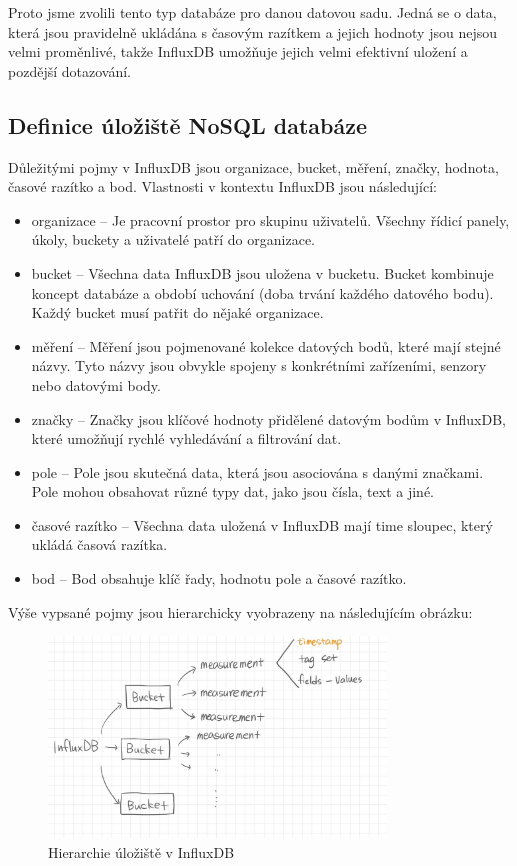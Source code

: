 \documentclass[a4paper, 11pt]{article}
\begin{document}
    Proto jsme zvolili tento typ databáze pro danou datovou sadu. Jedná se o data, která jsou pravidelně ukládána s časovým razítkem a jejich hodnoty jsou nejsou velmi proměnlivé, takže InfluxDB umožňuje jejich velmi efektivní uložení a pozdější dotazování.

    \subsection{Definice úložiště NoSQL databáze}

    Důležitými pojmy v InfluxDB jsou organizace, bucket, měření, značky, hodnota, časové razítko a bod. Vlastnosti v kontextu InfluxDB jsou následující:
    \begin{itemize}
        \item organizace -- Je pracovní prostor pro skupinu uživatelů. Všechny řídicí panely, úkoly, buckety a uživatelé patří do organizace.
        \item bucket -- Všechna data InfluxDB jsou uložena v bucketu. Bucket kombinuje koncept databáze a období uchování (doba trvání každého datového bodu). Každý bucket musí patřit do nějaké organizace.
        \item měření -- Měření jsou pojmenované kolekce datových bodů, které mají stejné názvy. Tyto názvy jsou obvykle spojeny s konkrétními zařízeními, senzory nebo datovými body.
        \item značky -- Značky jsou klíčové hodnoty přidělené datovým bodům v InfluxDB, které umožňují rychlé vyhledávání a filtrování dat.
        \item pole -- Pole jsou skutečná data, která jsou asociována s danými značkami. Pole mohou obsahovat různé typy dat, jako jsou čísla, text a jiné.
        \item časové razítko -- Všechna data uložená v InfluxDB mají \textunderscore time sloupec, který ukládá časová razítka.
        \item bod -- Bod obsahuje klíč řady, hodnotu pole a časové razítko.
    \end{itemize}
    Výše vypsané pojmy jsou hierarchicky vyobrazeny na následujícím obrázku:
    \begin{figure}[ht!]
        \centering
        \includegraphics[width=0.8\textwidth]{img/influx.png}
        \caption{Hierarchie úložiště v InfluxDB \label{InfluxHier}}
    \end{figure}
\end{document}
